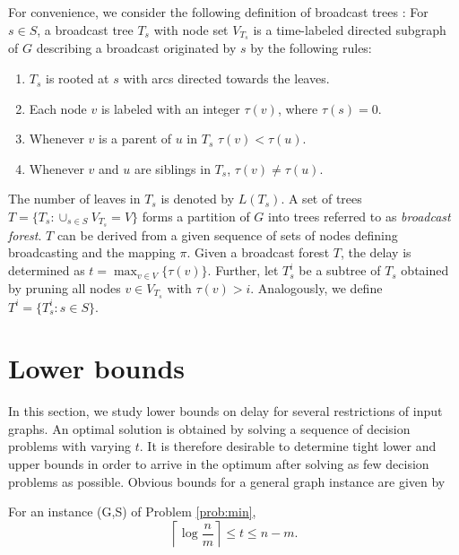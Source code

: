 For convenience, we consider the following definition of broadcast trees \cite{grigni91}:
For $s\in S$, a broadcast tree $T_s$ with node set $V_{T_s}$ is a time-labeled directed subgraph of $G$ describing a broadcast originated by $s$ by the following rules:
\begin{enumerate}
\item $T_s$ is rooted at $s$ with arcs directed towards the leaves.
\item Each node $v$ is labeled with an integer $\tau(v)$, where $\tau(s)=0$.
\item Whenever $v$ is a parent of $u$ in $T_s$ $\tau(v)<\tau(u)$.
\item Whenever $v$ and $u$ are siblings in $T_s$, $\tau(v)\neq \tau(u)$. 
\end{enumerate}
The number of leaves in $T_s$ is denoted by $L(T_s)$.
A set of trees $T=\{T_s:\cup_{s\in S}V_{T_s}=V\}$ forms a partition of $G$ into trees referred to as \emph{broadcast forest}.
$T$ can be derived from a given sequence of sets of nodes defining broadcasting and the mapping $\pi$.
Given a broadcast forest $T$, the delay is determined as $t=\max_{v\in V}\{\tau(v)\}$.
Further, let $T^i_s$ be a subtree of $T_s$ obtained by pruning all nodes $v\in V_{T_s}$ with $\tau(v)>i$.
Analogously, we define $T^i=\{T^i_s:s\in S\}$. 



\section{Lower bounds}
In this section, we study lower bounds on delay for several restrictions of input graphs.
An optimal solution is obtained by solving a sequence of decision problems with varying $t$. 
It is therefore desirable to determine tight lower and upper bounds in order to arrive in the optimum after solving as few decision problems as possible.
Obvious bounds for a general graph instance are given by
\begin{observation}
For an instance (G,S) of Problem \ref{prob:min},
$$\left\lceil\log\frac{n}{m}\right\rceil\leq t \leq n-m.$$
\end{observation}

